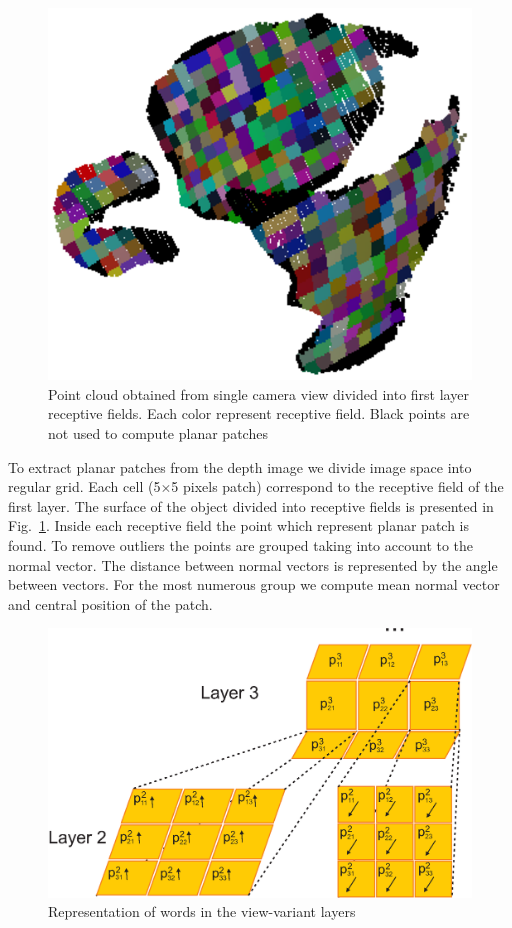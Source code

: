 \documentclass[letterpaper,10pt,conference]{ieeeconf}  %
\begin{document}
\begin{figure}[t]
 \centering
\includegraphics[width=0.5\columnwidth]{../images/recFields1.eps}
\caption{Point cloud obtained from single camera view divided into first layer receptive fields. Each color represent receptive field. Black points are not used to compute planar patches}
 \label{recFields1}
\end{figure}

To extract planar patches from the depth image we divide image space into regular grid. Each cell (5$\times$5 pixels patch) correspond to the receptive field of the first layer. The surface of the object divided into receptive fields is presented in Fig.~\ref{recFields1}. Inside each receptive field the point which represent planar patch is found. To remove outliers the points are grouped taking into account to the normal vector. The distance between normal vectors is represented by the angle between vectors. For the most numerous group we compute mean normal vector and central position of the patch.

\begin{figure}[t]
 \centering
\includegraphics[width=0.9\columnwidth]{../images/word.eps}
\caption{Representation of words in the view-variant layers}
 \label{word}
\end{figure}
\end{document}
